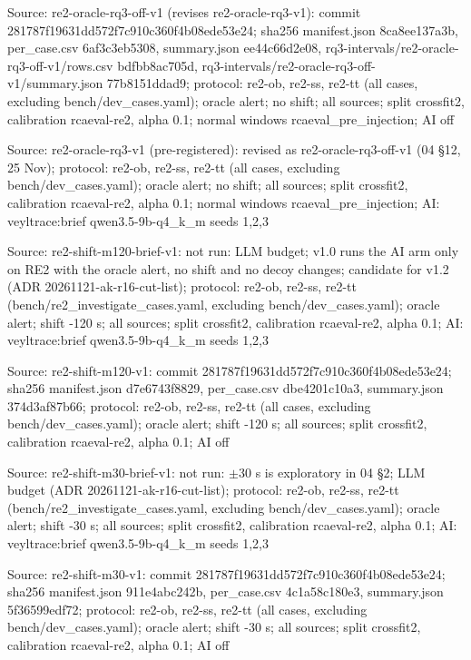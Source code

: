 \noindent Source: re2-oracle-rq3-off-v1 (revises re2-oracle-rq3-v1): commit 281787f19631dd572f7c910c360f4b08ede53e24; sha256 manifest.json 8ca8ee137a3b, per\_case.csv 6af3c3eb5308, summary.json ee44c66d2e08, rq3-intervals/\allowbreak{}re2-oracle-rq3-off-v1/\allowbreak{}rows.csv bdfbb8ac705d, rq3-intervals/\allowbreak{}re2-oracle-rq3-off-v1/\allowbreak{}summary.json 77b8151ddad9; protocol: re2-ob, re2-ss, re2-tt (all cases, excluding bench/\allowbreak{}dev\_cases.yaml); oracle alert; no shift; all sources; split crossfit2, calibration rcaeval-re2, alpha 0.1; normal windows rcaeval\_pre\_injection; AI off\par
\noindent Source: re2-oracle-rq3-v1 (pre-registered): revised as re2-oracle-rq3-off-v1 (04 \S{}12, 25 Nov); protocol: re2-ob, re2-ss, re2-tt (all cases, excluding bench/\allowbreak{}dev\_cases.yaml); oracle alert; no shift; all sources; split crossfit2, calibration rcaeval-re2, alpha 0.1; normal windows rcaeval\_pre\_injection; AI: veyltrace:brief qwen3.5-9b-q4\_k\_m seeds 1,2,3\par
\noindent Source: re2-shift-m120-brief-v1: not run: LLM budget; v1.0 runs the AI arm only on RE2 with the oracle alert, no shift and no decoy changes; candidate for v1.2 (ADR 20261121-ak-r16-cut-list); protocol: re2-ob, re2-ss, re2-tt (bench/\allowbreak{}re2\_investigate\_cases.yaml, excluding bench/\allowbreak{}dev\_cases.yaml); oracle alert; shift -120 s; all sources; split crossfit2, calibration rcaeval-re2, alpha 0.1; AI: veyltrace:brief qwen3.5-9b-q4\_k\_m seeds 1,2,3\par
\noindent Source: re2-shift-m120-v1: commit 281787f19631dd572f7c910c360f4b08ede53e24; sha256 manifest.json d7e6743f8829, per\_case.csv dbe4201c10a3, summary.json 374d3af87b66; protocol: re2-ob, re2-ss, re2-tt (all cases, excluding bench/\allowbreak{}dev\_cases.yaml); oracle alert; shift -120 s; all sources; split crossfit2, calibration rcaeval-re2, alpha 0.1; AI off\par
\noindent Source: re2-shift-m30-brief-v1: not run: $\pm$30 s is exploratory in 04 \S{}2; LLM budget (ADR 20261121-ak-r16-cut-list); protocol: re2-ob, re2-ss, re2-tt (bench/\allowbreak{}re2\_investigate\_cases.yaml, excluding bench/\allowbreak{}dev\_cases.yaml); oracle alert; shift -30 s; all sources; split crossfit2, calibration rcaeval-re2, alpha 0.1; AI: veyltrace:brief qwen3.5-9b-q4\_k\_m seeds 1,2,3\par
\noindent Source: re2-shift-m30-v1: commit 281787f19631dd572f7c910c360f4b08ede53e24; sha256 manifest.json 911e4abc242b, per\_case.csv 4c1a58c180e3, summary.json 5f36599edf72; protocol: re2-ob, re2-ss, re2-tt (all cases, excluding bench/\allowbreak{}dev\_cases.yaml); oracle alert; shift -30 s; all sources; split crossfit2, calibration rcaeval-re2, alpha 0.1; AI off\par
